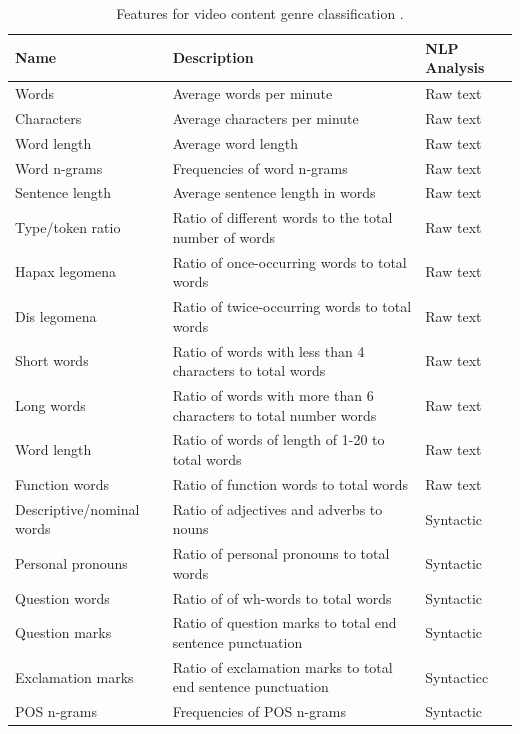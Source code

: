 \begin{table}[t]
	\center
	\caption {Features for video content genre classification  \parencite{lee2017text}.}\label{chap:relevant_work:tbl:videogenre_textbased_special_features}
	\begin{tabular}{p{4cm}p{7cm}p{3cm}}
		\hline
		Name & Description & NLP Analysis \\
		\hline
		Words & Average words per minute & Raw text  \\
        Characters & Average characters per minute & Raw text  \\
        Word length & Average word length & Raw text  \\
        Word n-grams & Frequencies of word n-grams & Raw text \\
        Sentence length & Average sentence length in words & Raw text \\
        Type/token ratio & Ratio of different words to the total number of words & Raw text \\
        Hapax legomena & Ratio of once-occurring words to total words  & Raw text  \\
        Dis legomena & Ratio of twice-occurring words to total words & Raw text  \\
        Short words & Ratio of words with less than 4 characters to total words & Raw text  \\
        Long words & Ratio of words with more than 6 characters to total number words & Raw text \\
        Word length & Ratio of words of length of 1-20 to total words & Raw text \\
        Function words & Ratio of function words to total words  & Raw text \\
        Descriptive/nominal words & Ratio of adjectives and adverbs to nouns & Syntactic \\
        Personal pronouns & Ratio of personal pronouns to total words & Syntactic \\
        Question words & Ratio of of wh-words to total words & Syntactic \\
        Question marks & Ratio of question marks to total end sentence punctuation & Syntactic \\
        Exclamation marks & Ratio of exclamation marks to total end sentence punctuation & Syntacticc \\
        POS n-grams & Frequencies of POS n-grams & Syntactic \\
  		\hline
	\end{tabular}
\end{table}

